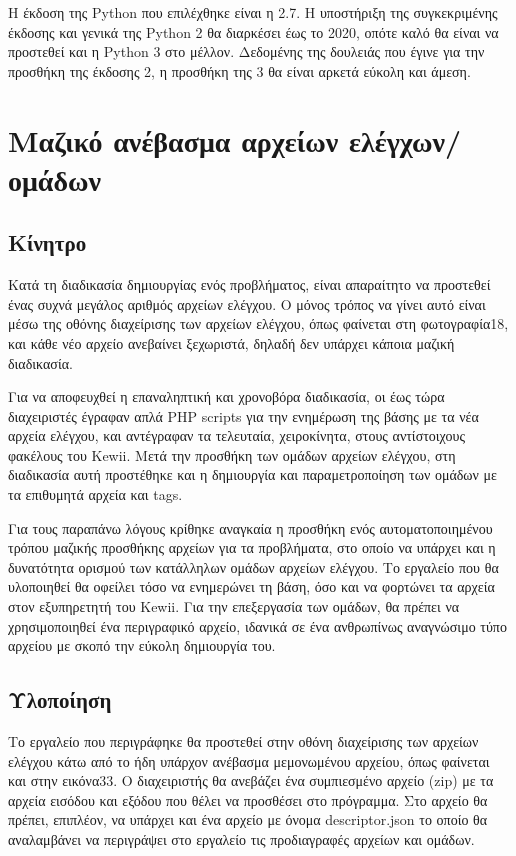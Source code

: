\documentclass[diploma]{softlab-thesis}
\begin{document}
\bigskip

Η έκδοση της Python που επιλέχθηκε είναι η 2.7. Η υποστήριξη της συγκεκριμένης
έκδοσης και γενικά της Python 2 θα διαρκέσει έως το 2020, οπότε καλό θα είναι
να προστεθεί και η Python 3 στο μέλλον. Δεδομένης της δουλειάς που έγινε για
την προσθήκη της έκδοσης 2, η προσθήκη της 3 θα είναι αρκετά εύκολη και άμεση.

\section{Μαζικό ανέβασμα αρχείων ελέγχων/ομάδων}

\subsection{Κίνητρο}

Κατά τη διαδικασία δημιουργίας ενός προβλήματος, είναι απαραίτητο να προστεθεί
ένας συχνά μεγάλος αριθμός αρχείων ελέγχου. Ο μόνος τρόπος να γίνει αυτό είναι
μέσω της οθόνης διαχείρισης των αρχείων ελέγχου, όπως φαίνεται στη
φωτογραφία18, και κάθε νέο αρχείο ανεβαίνει ξεχωριστά, δηλαδή δεν υπάρχει
κάποια μαζική διαδικασία.

\bigskip

Για να αποφευχθεί η επαναληπτική και χρονοβόρα διαδικασία, οι έως τώρα διαχειριστές
έγραφαν απλά PHP scripts για την ενημέρωση της βάσης με τα νέα αρχεία ελέγχου,
και αντέγραφαν τα τελευταία, χειροκίνητα, στους αντίστοιχους φακέλους του Kewii.
Μετά την προσθήκη των ομάδων αρχείων ελέγχου, στη διαδικασία αυτή προστέθηκε και
η δημιουργία και παραμετροποίηση των ομάδων με τα επιθυμητά αρχεία και tags.

\bigskip

Για τους παραπάνω λόγους κρίθηκε αναγκαία η προσθήκη ενός αυτοματοποιημένου
τρόπου μαζικής προσθήκης αρχείων για τα προβλήματα, στο οποίο να υπάρχει και η
δυνατότητα ορισμού των κατάλληλων ομάδων αρχείων ελέγχου. Το εργαλείο που θα
υλοποιηθεί θα οφείλει τόσο να ενημερώνει τη βάση, όσο και να φορτώνει τα αρχεία
στον εξυπηρετητή του Kewii. Για την επεξεργασία των ομάδων, θα πρέπει να
χρησιμοποιηθεί ένα περιγραφικό αρχείο, ιδανικά σε ένα ανθρωπίνως αναγνώσιμο
τύπο αρχείου με σκοπό την εύκολη δημιουργία του.

\subsection{Υλοποίηση}

Το εργαλείο που περιγράφηκε θα προστεθεί στην οθόνη διαχείρισης των αρχείων
ελέγχου κάτω από το ήδη υπάρχον ανέβασμα μεμονωμένου αρχείου, όπως φαίνεται και
στην εικόνα33. Ο διαχειριστής θα ανεβάζει ένα συμπιεσμένο αρχείο (zip) με τα
αρχεία εισόδου και εξόδου που θέλει να προσθέσει στο πρόγραμμα. Στο αρχείο θα
πρέπει, επιπλέον, να υπάρχει και ένα αρχείο με όνομα descriptor.json το οποίο
θα αναλαμβάνει να περιγράψει στο εργαλείο τις προδιαγραφές αρχείων και ομάδων.
\end{document}
